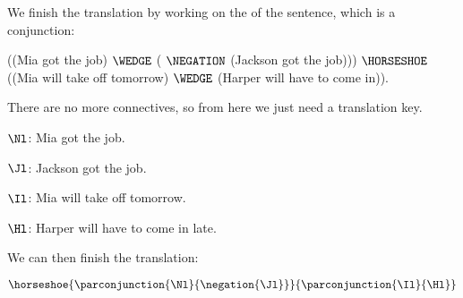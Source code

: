 \begin{majorILnc}{}
	We finish the translation by working on the  of the sentence, which is a conjunction: 
	\begin{menumerate}
		\item\label{GSLTransSentenceL} ((Mia got the job) $\WEDGE$ ( $\NEGATION$ (Jackson got the job))) $\HORSESHOE$ ((Mia will take off tomorrow) $\WEDGE$ (Harper will have to come in)).
	\end{menumerate}
	There are no more connectives, so from here we just need a translation key. 
	\begin{description}[itemsep=0em]
		\item[Translation Key:] \hfill{} 
		\begin{description}[itemsep=0em]
			\item[] $\Nl$: Mia got the job.
			\item[] $\Jl$: Jackson got the job. 
			\item[] $\Il$: Mia will take off tomorrow.
			\item[] $\Hl$: Harper will have to come in late.  
		\end{description}
	\end{description}
	We can then finish the translation: 
	\begin{menumerate}
		\item\label{GSLTransSentenceM} $\horseshoe{\parconjunction{\Nl}{\negation{\Jl}}}{\parconjunction{\Il}{\Hl}}$
	\end{menumerate}
\end{majorILnc}


